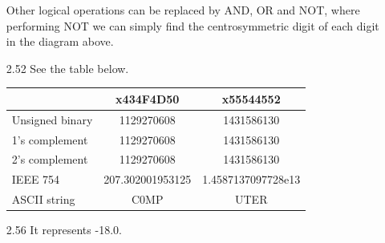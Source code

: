 \documentclass[a4paper]{article}
\begin{document}
\begin{enumerate}
  Other logical operations can be replaced by AND, OR and NOT, where
  performing NOT we can simply find the centrosymmetric digit of each
  digit in the diagram above.

\item[2.52] See the table below.

  \begin{center}
  \begin{tabular}{l|c|c}
    \hline
    & x434F4D50 & x55544552 \\
    \hline
    Unsigned binary & 1129270608 & 1431586130 \\
    \hline
    1's complement & 1129270608 & 1431586130 \\
    \hline
    2's complement & 1129270608 & 1431586130 \\
    \hline
    IEEE 754 & 207.302001953125 & 1.4587137097728e13 \\
    \hline
    ASCII string & C0MP & UTER \\
    \hline
  \end{tabular}
  \end{center}

\item[2.56] It represents -18.0.
\end{enumerate}
\end{document}
